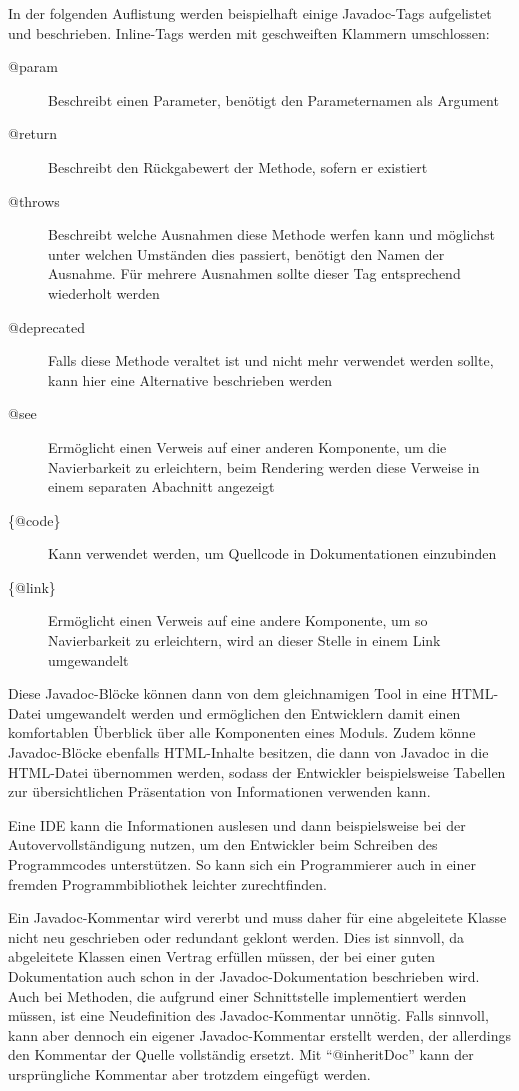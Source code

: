 In der folgenden Auflistung werden beispielhaft einige Javadoc-Tags aufgelistet und beschrieben. Inline-Tags werden mit geschweiften Klammern umschlossen:
\begin{description}
         \item[@param]  Beschreibt einen Parameter, benötigt den Parameternamen als Argument
         \item[@return]  Beschreibt den Rückgabewert der Methode, sofern er existiert 
         \item[@throws] Beschreibt welche Ausnahmen diese Methode werfen kann und möglichst unter welchen Umständen dies passiert, benötigt den Namen der Ausnahme. Für mehrere Ausnahmen sollte dieser Tag entsprechend wiederholt werden 
         \item[@deprecated] Falls diese Methode veraltet ist und nicht mehr verwendet werden sollte, kann hier eine Alternative beschrieben werden
         \item[@see] Ermöglicht einen Verweis auf einer anderen Komponente, um die Navierbarkeit zu erleichtern, beim Rendering werden diese Verweise in einem separaten Abachnitt angezeigt
         \item[\{@code\}] Kann verwendet werden, um Quellcode in Dokumentationen einzubinden
         \item [\{@link\}] Ermöglicht einen  Verweis auf eine andere Komponente, um so Navierbarkeit zu erleichtern, wird an dieser Stelle in einem Link umgewandelt
        
\end{description}



Diese Javadoc-Blöcke können dann von dem gleichnamigen Tool in eine \ac{HTML}-Datei umgewandelt werden und ermöglichen den Entwicklern damit einen komfortablen Überblick über alle Komponenten eines Moduls. Zudem könne Javadoc-Blöcke ebenfalls \ac{HTML}-Inhalte besitzen, die dann von Javadoc in die \ac{HTML}-Datei übernommen werden, sodass der Entwickler beispielsweise Tabellen zur übersichtlichen Präsentation  von Informationen verwenden kann. 

Eine \ac{IDE} kann die Informationen auslesen und dann beispielsweise bei der Autovervollständigung nutzen, um den Entwickler beim Schreiben des Programmcodes unterstützen. So kann sich ein Programmierer auch in einer fremden Programmbibliothek leichter zurechtfinden.

Ein Javadoc-Kommentar wird vererbt und muss daher für eine abgeleitete Klasse nicht neu geschrieben oder redundant geklont werden. Dies ist sinnvoll, da abgeleitete Klassen einen Vertrag erfüllen müssen, der bei einer guten Dokumentation auch schon in der Javadoc-Dokumentation beschrieben wird. Auch bei Methoden, die aufgrund einer Schnittstelle implementiert werden müssen, ist eine Neudefinition des Javadoc-Kommentar unnötig. Falls sinnvoll, kann aber dennoch ein eigener Javadoc-Kommentar erstellt werden, der allerdings den Kommentar der Quelle vollständig ersetzt. Mit \enquote{@inheritDoc} kann der ursprüngliche Kommentar aber trotzdem eingefügt werden.

